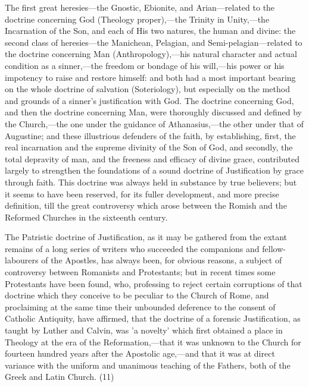 \documentclass[
]{book}
\begin{document}
The first great heresies---the Gnostic, Ebionite, and Arian---related to the doctrine concerning God (Theology proper),---the Trinity in Unity,---the Incarnation of the Son, and each of His two natures, the human and divine: the second class of heresies---the Manichean, Pelagian, and Semi-pelagian---related to the doctrine concerning Man (Anthropology),---his natural character and actual condition as a sinner,---the freedom or bondage of his will,---his power or his impotency to raise and restore himself: and both had a most important bearing on the whole doctrine of salvation (Soteriology), but especially on the method and grounds of a sinner's justification with God. The doctrine concerning God, and then the doctrine concerning Man, were thoroughly discussed and defined by the Church,---the one under the guidance of Athanasius,---the other under that of Augustine; and these illustrious defenders of the faith, by establishing, first, the real incarnation and the supreme divinity of the Son of God, and secondly, the total depravity of man, and the freeness and efficacy of divine grace, contributed largely to strengthen the foundations of a sound doctrine of Justification by grace through faith. This doctrine was always held in substance by true believers; but it seems to have been reserved, for its fuller development, and more precise definition, till the great controversy which arose between the Romish and the Reformed Churches in the sixteenth century.

The Patristic doctrine of Justification, as it may be gathered from the extant remains of a long series of writers who succeeded the companions and fellow-labourers of the Apostles, has always been, for obvious reasons, a subject of controversy between Romanists and Protestants; but in recent times some Protestants have been found, who, professing to reject certain corruptions of that doctrine which they conceive to be peculiar to the Church of Rome, and proclaiming at the same time their unbounded deference to the consent of Catholic Antiquity, have affirmed, that the doctrine of a forensic Justification, as taught by Luther and Calvin, was 'a novelty' which first obtained a place in Theology at the era of the Reformation,---that it was unknown to the Church for fourteen hundred years after the Apostolic age,---and that it was at direct variance with the uniform and unanimous teaching of the Fathers, both of the Greek and Latin Church. (11)
\end{document}
